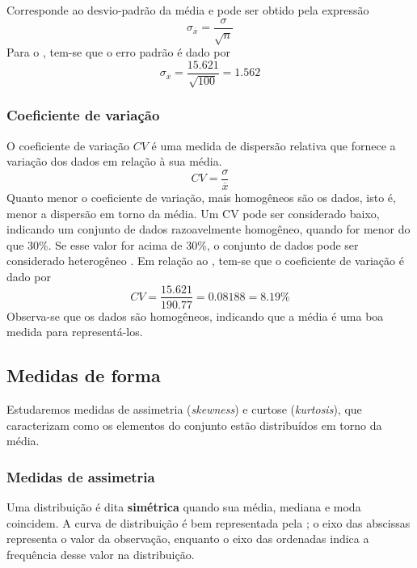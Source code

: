 Corresponde ao desvio-padrão da média e pode ser obtido pela expressão
\begin{equation}
    \sigma_{\overline{x}} = \frac{\sigma}{\sqrt{n}}
    \label{eq:erro-padrao}
\end{equation}
Para o , tem-se que o erro padrão é dado por
\[
    \sigma_{\overline{x}}=\frac{15.621}{\sqrt{100}}=1.562
\]

\subsubsection{Coeficiente de variação}

O coeficiente de variação $CV$ é uma medida de dispersão relativa que fornece a
variação dos dados em relação à sua média.
\begin{equation}
    CV = \frac{\sigma}{\overline{x}}
    \label{eq:coef-variacao}
\end{equation}
Quanto menor o coeficiente de variação, mais homogêneos são os dados, isto é,
menor a dispersão em torno da média. Um CV pode ser considerado baixo,
indicando um conjunto de dados razoavelmente homogêneo, quando for menor do que
30\%. Se esse valor for acima de 30\%, o conjunto de dados pode ser considerado
heterogêneo \parencite[p.~159]{favero}. Em relação ao ,
tem-se que o coeficiente de variação é dado por
\[
CV = \frac{15.621}{190.77} = 0.08188 = 8.19\%
\]
Observa-se que os dados são homogêneos, indicando que a média é uma boa medida
para representá-los.

\subsection{Medidas de forma}%

Estudaremos medidas de assimetria (\emph{skewness}) e curtose
(\emph{kurtosis}), que caracterizam como os elementos do conjunto estão
distribuídos em torno da média.

\subsubsection{Medidas de assimetria}

Uma distribuição é dita \textbf{simétrica} quando sua média, mediana e moda
coincidem. A curva de distribuição é bem representada pela
; o eixo das abscissas representa o valor da
observação, enquanto o eixo das ordenadas indica a frequência desse valor na
distribuição.

